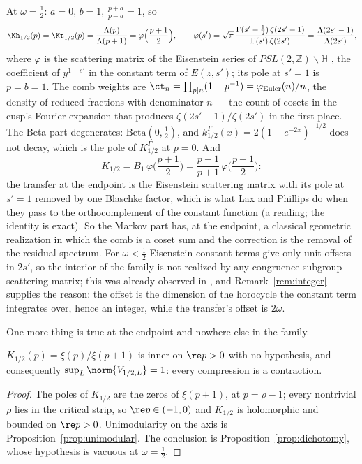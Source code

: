 At $\omega=\frac12$: $a=0$, $b=1$, $\frac{p+a}{p-a}=1$, so
\begin{equation}\label{eq:endpoint}
 \Kh_{1/2}(p)=\Kt_{1/2}(p)=\frac{\Lambda(p)}{\Lambda(p+1)}=\varphi\Big(\frac{p+1}2\Big),
 \qquad
 \varphi(s')=\sqrt\pi\,\frac{\Gamma(s'-\frac12)\,\zeta(2s'-1)}{\Gamma(s')\,\zeta(2s')}
 =\frac{\Lambda(2s'-1)}{\Lambda(2s')},
\end{equation}
where $\varphi$ is the scattering matrix of the Eisenstein series of
$PSL(2,\mathbb Z)\backslash\mathbb H$ \cite{Iwaniec}, the coefficient of
$y^{1-s'}$ in the constant term of $E(z,s')$; its pole at $s'=1$ is $p=b=1$.
The comb weights are $\ct_n=\prod_{p\mid n}(1-p^{-1})=\varphi_{\mathrm{Euler}}(n)/n$,
the density of reduced fractions with denominator $n$ --- the count of cosets
in the cusp's Fourier expansion that produces $\zeta(2s'-1)/\zeta(2s')$ in the
first place. The Beta part degenerates: $\mathrm{Beta}(0,\frac12)$, and
$k^\Gamma_{1/2}(x)=2(1-e^{-2x})^{-1/2}$ does not decay, which is the pole of
$K^\Gamma_{1/2}$ at $p=0$. And
\begin{equation}\label{eq:laxphillips}
 K_{1/2}=B_1\,\varphi\Big(\frac{p+1}2\Big)=\frac{p-1}{p+1}\,\varphi\Big(\frac{p+1}2\Big):
\end{equation}
the transfer at the endpoint is the Eisenstein scattering matrix with its pole
at $s'=1$ removed by one Blaschke factor, which is what Lax and Phillips do
when they pass to the orthocomplement of the constant function
\cite{LaxPhillips} (a reading; the identity is exact). So the Markov part has,
at the endpoint, a classical geometric realization in which the comb is a
coset sum and the correction is the removal of the residual spectrum. For
$\omega<\frac12$ Eisenstein constant terms give only unit offsets in $2s'$, so
the interior of the family is not realized by any congruence-subgroup
scattering matrix; this was already observed in \cite{WilsonReview}, and
Remark~\ref{rem:integer} supplies the reason: the offset is the dimension of the
horocycle the constant term integrates over, hence an integer, while the
transfer's offset is $2\omega$.

One more thing is true at the endpoint and nowhere else in the family.

\begin{proposition}\label{prop:endpointfree}
$K_{1/2}(p)=\xi(p)/\xi(p+1)$ is inner on $\re p>0$ with no hypothesis, and
consequently $\sup_L\norm{V_{1/2,L}}=1$: every compression is a contraction.
\end{proposition}
\begin{proof}
The poles of $K_{1/2}$ are the zeros of $\xi(p+1)$, at $p=\rho-1$; every
nontrivial $\rho$ lies in the critical strip, so $\re p\in(-1,0)$ and $K_{1/2}$
is holomorphic and bounded on $\re p>0$. Unimodularity on the axis is
Proposition~\ref{prop:unimodular}. The conclusion is
Proposition~\ref{prop:dichotomy}, whose hypothesis is vacuous at $\omega=\frac12$.
\end{proof}


